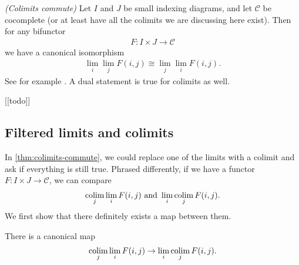 \begin{theorem}\label{thm:colimits-commute} \textit{(Colimits commute)} Let $I$ and $J$ be small indexing diagrams, and let $\mathscr{C}$ be cocomplete (or at least have all the colimits we are discussing here exist). Then for any bifunctor
\begin{align*}
    F: I \times J \to \mathscr{C}
\end{align*}
we have a canonical isomorphism
\begin{align*}
    \lim_i \lim_j F(i,j) \cong \lim_j \lim_i F(i,j).
\end{align*}
See for example \cite[3.8.1]{Riehl-context}. A dual statement is true for colimits as well.
\end{theorem}





\begin{center}
    [[todo]]    
\end{center}

\subsection{Filtered limits and colimits}

In \autoref{thm:colimits-commute}, we could replace one of the limits with a colimit and ask if everything is still true. Phrased differently, if we have a functor $F: I \times J \to \mathscr{C}$, we can compare
\begin{align*}
    \mathop{\operatorname*{colim}}_j \lim_i F(i,j) \text{ and } \lim_i \mathop{\operatorname*{colim}}_j F(i,j).
\end{align*}
We first show that there definitely exists a map between them.

\begin{proposition}\label{prop:labelname} There is a canonical map
\begin{align*}
    \mathop{\operatorname*{colim}}_j \lim_i F(i,j) \to \lim_i \mathop{\operatorname*{colim}}_j F(i,j).
\end{align*}
\end{proposition}

